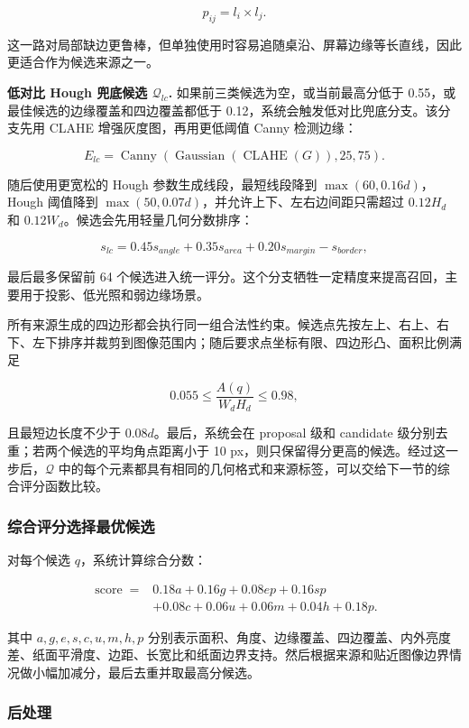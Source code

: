 \documentclass[letterpaper]{article}
\begin{document}
\[
p_{ij}=l_i\times l_j.
\]

这一路对局部缺边更鲁棒，但单独使用时容易追随桌沿、屏幕边缘等长直线，因此更适合作为候选来源之一。

\textbf{低对比 Hough 兜底候选 \(\mathcal{Q}_{lc}\).}
如果前三类候选为空，或当前最高分低于 0.55，或最佳候选的边缘覆盖和四边覆盖都低于 0.12，系统会触发低对比兜底分支。该分支先用 CLAHE 增强灰度图，再用更低阈值 Canny 检测边缘：

\[
E_{lc}=\operatorname{Canny}(\operatorname{Gaussian}(\operatorname{CLAHE}(G)),25,75).
\]

随后使用更宽松的 Hough 参数生成线段，最短线段降到 \(\max(60,0.16d)\)，Hough 阈值降到 \(\max(50,0.07d)\)，并允许上下、左右边间距只需超过 \(0.12H_d\) 和 \(0.12W_d\)。候选会先用轻量几何分数排序：

\[
s_{lc}=0.45s_{angle}+0.35s_{area}+0.20s_{margin}-s_{border},
\]

最后最多保留前 64 个候选进入统一评分。这个分支牺牲一定精度来提高召回，主要用于投影、低光照和弱边缘场景。

所有来源生成的四边形都会执行同一组合法性约束。候选点先按左上、右上、右下、左下排序并裁剪到图像范围内；随后要求点坐标有限、四边形凸、面积比例满足

\[
0.055 \leq \frac{A(q)}{W_dH_d} \leq 0.98,
\]

且最短边长度不少于 \(0.08d\)。最后，系统会在 proposal 级和 candidate 级分别去重；若两个候选的平均角点距离小于 10 px，则只保留得分更高的候选。经过这一步后，\(\mathcal{Q}\) 中的每个元素都具有相同的几何格式和来源标签，可以交给下一节的综合评分函数比较。

\subsubsection{综合评分选择最优候选}

对每个候选 \(q\)，系统计算综合分数：

\[
\begin{aligned}
\operatorname{score}={}&
0.18a+0.16g+0.08ep+0.16sp\\
&+0.08c+0.06u+0.06m+0.04h+0.18p .
\end{aligned}
\]

其中 \(a,g,e,s,c,u,m,h,p\) 分别表示面积、角度、边缘覆盖、四边覆盖、内外亮度差、纸面平滑度、边距、长宽比和纸面边界支持。然后根据来源和贴近图像边界情况做小幅加减分，最后去重并取最高分候选。

\subsubsection{后处理}
\end{document}
